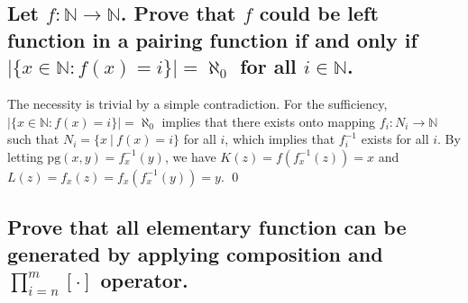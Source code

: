 \documentclass[11pt]{article}
\begin{document}
\subsection{Let $f:\mathbb{N}\to\mathbb{N}$. Prove that $f$ could be left function in
a pairing function if and only if $|\{x\in\mathbb{N} : f(x) = i\}|=\aleph_0$
for all $i\in\mathbb{N}$.}

\begin{pf} \rm
 The necessity is trivial by a simple contradiction.
 For the sufficiency, $|\{x\in\mathbb{N} : f(x) = i\}|=\aleph_0$ implies that
 there exists onto mapping
 $f_i : N_i\to \mathbb{N}$ such that $N_i = \{x~ | ~f(x) = i\}$ for all $i$,
 which implies that $f_i^{-1}$ exists for all $i$.
 By letting $\mathrm{pg}(x, y) = f_x^{-1}(y)$,
 we have $K(z) = f(f_x^{-1}(z)) = x$ and $L(z) 
 = f_x(z) = f_x( f_x^{-1}(y) ) = y$. \qed

\end{pf}

\subsection{Prove that all elementary function can be generated by applying
composition and $\prod_{i=n}^m [\cdot]$ operator.}
\end{document}
